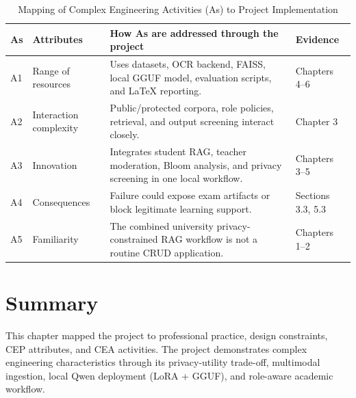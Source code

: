 \begin{table}[H]
\centering
\caption{Mapping of Complex Engineering Activities (As) to Project Implementation}
\label{tab:activities_mapping}
\begin{tabular}{|p{}|p{}|p{}|p{}|}
\hline
\textbf{As} & \textbf{Attributes} & \textbf{How As are addressed through the project} & \textbf{Evidence}\\
\hline
A1 & Range of resources & Uses datasets, OCR backend, FAISS, local GGUF model, evaluation scripts, and LaTeX reporting. & Chapters 4--6\\
\hline
A2 & Interaction complexity & Public/protected corpora, role policies, retrieval, and output screening interact closely. & Chapter 3\\
\hline
A3 & Innovation & Integrates student RAG, teacher moderation, Bloom analysis, and privacy screening in one local workflow. & Chapters 3--5\\
\hline
A4 & Consequences & Failure could expose exam artifacts or block legitimate learning support. & Sections 3.3, 5.3\\
\hline
A5 & Familiarity & The combined university privacy-constrained RAG workflow is not a routine CRUD application. & Chapters 1--2\\
\hline
\end{tabular}
\end{table}

\section{Summary}

This chapter mapped the project to professional practice, design constraints, CEP attributes, and CEA activities. The project demonstrates complex engineering characteristics through its privacy-utility trade-off, multimodal ingestion, local Qwen deployment (LoRA + GGUF), and role-aware academic workflow.
